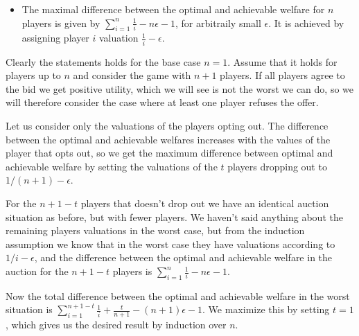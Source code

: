 \begin{itemize}
\item The maximal difference between the optimal and achievable welfare for $n$ players is given by $\sum_{i=1}^n \frac{1}{i} - n \epsilon - 1$, for arbitraily small $\epsilon$. It is achieved by assigning player $i$ valuation $\frac{1}{i} - \epsilon$.

\end{itemize}


Clearly the statements holds for the base case $n=1$. Assume that it holds for players up to $n$ and consider the game with $n+1$ players. If all players agree to the bid we get positive utility, which we will see is not the worst we can do, so we will therefore consider the case where at least one player refuses the offer.

Let us consider only the valuations of the players opting out. The difference between the optimal and achievable welfares increases with the values of the player that opts out, so we get the maximum difference between optimal and achievable welfare by setting the valuations of the $t$ players dropping out to $1/(n+1)- \epsilon$. 

For the $n+1-t$ players that doesn't drop out we have an identical auction situation as before, but with fewer players. We haven't said anything about the remaining players valuations in the worst case, but from the induction assumption we know that in the worst case they have valuations according to $1/i - \epsilon$, and the difference between the optimal and achievable welfare in the auction for the $n+1-t$ players is $\sum_{i=1}^n \frac{1}{i} - n \epsilon - 1$.

Now the total difference between the optimal and achievable welfare in the worst situation is $\sum_{i=1}^{n+1-t} \frac{1}{i} + \frac{t}{n+1} - (n+1) \epsilon - 1$. We maximize this by setting $t=1$, which gives us the desired result by induction over $n$.

